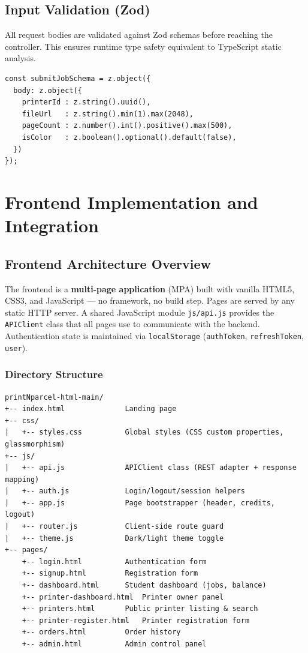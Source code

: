 \documentclass[12pt,a4paper]{report}
\begin{document}
\section{Input Validation (Zod)}

All request bodies are validated against Zod schemas before reaching the controller.
This ensures runtime type safety equivalent to TypeScript static analysis.

\begin{lstlisting}[style=jsStyle, caption={Zod schema example for job submission}]
const submitJobSchema = z.object({
  body: z.object({
    printerId : z.string().uuid(),
    fileUrl   : z.string().min(1).max(2048),
    pageCount : z.number().int().positive().max(500),
    isColor   : z.boolean().optional().default(false),
  })
});
\end{lstlisting}

\clearpage

\chapter{Frontend Implementation and Integration}

\section{Frontend Architecture Overview}

The frontend is a \textbf{multi-page application} (MPA) built with vanilla HTML5, CSS3, and
JavaScript — no framework, no build step. Pages are served by any static HTTP server.
A shared JavaScript module \texttt{js/api.js} provides the \texttt{APIClient} class that all
pages use to communicate with the backend. Authentication state is maintained via
\texttt{localStorage} (\texttt{authToken}, \texttt{refreshToken}, \texttt{user}).

\subsection{Directory Structure}
\begin{verbatim}
printNparcel-html-main/
+-- index.html              Landing page
+-- css/
|   +-- styles.css          Global styles (CSS custom properties, glassmorphism)
+-- js/
|   +-- api.js              APIClient class (REST adapter + response mapping)
|   +-- auth.js             Login/logout/session helpers
|   +-- app.js              Page bootstrapper (header, credits, logout)
|   +-- router.js           Client-side route guard
|   +-- theme.js            Dark/light theme toggle
+-- pages/
    +-- login.html          Authentication form
    +-- signup.html         Registration form
    +-- dashboard.html      Student dashboard (jobs, balance)
    +-- printer-dashboard.html  Printer owner panel
    +-- printers.html       Public printer listing & search
    +-- printer-register.html   Printer registration form
    +-- orders.html         Order history
    +-- admin.html          Admin control panel
\end{verbatim}
\end{document}
